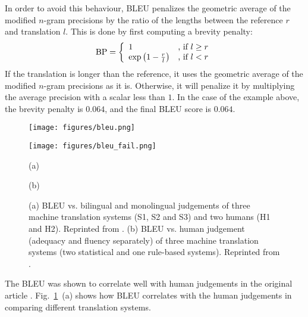 \documentclass{report}
\newcommand{\BP}{\text{BP}}
\begin{document}
In order to avoid this behaviour, BLEU penalizes the geometric average of the
modified $n$-gram precisions by the ratio of the lengths between the reference
$r$ and translation $l$. This is done by first computing a brevity penalty:
\begin{align*}
    \BP = \left\{ 
        \begin{array}{l l}
            1 & \text{, if }l \geq r \\
            \exp\left( 1 - \frac{r}{l} \right) & \text{, if }l < r
        \end{array}
        \right.
\end{align*}
If the translation is longer than the reference, it uses the geometric average
of the modified $n$-gram precisions as it is. Otherwise, it will penalize it by
multiplying the average precision with a scalar less than $1$. 
In the case of the example above, the brevity penalty is $0.064$, and the final
BLEU score is $0.064$. 

\begin{figure}[ht]
    \centering
    \begin{minipage}{0.48\textwidth}
        \centering
        \texttt{[image: figures/bleu.png]}
    \end{minipage}
    \hfill
    \begin{minipage}{0.48\textwidth}
        \centering
        \texttt{[image: figures/bleu\_fail.png]}
    \end{minipage}

    \begin{minipage}{0.48\textwidth}
        \centering
        (a)
    \end{minipage}
    \hfill
    \begin{minipage}{0.48\textwidth}
        \centering
        (b)
    \end{minipage}
    \caption{(a) BLEU vs. bilingual and monolingual judgements of three machine
    translation systems (S1, S2 and S3) and two humans (H1 and H2). Reprinted
from \citet{papineni2002bleu}. (b) BLEU vs. human judgement (adequacy and fluency
separately) of three machine translation systems (two statistical and one
rule-based systems). Reprinted from \citet{callison2006re}.}
    \label{fig:bleu}
\end{figure}

The BLEU was shown to correlate well with human judgements in the original
article \citep{papineni2002bleu}. Fig.~\ref{fig:bleu}~(a) shows how BLEU correlates
with the human judgements in comparing different translation systems.
\end{document}
